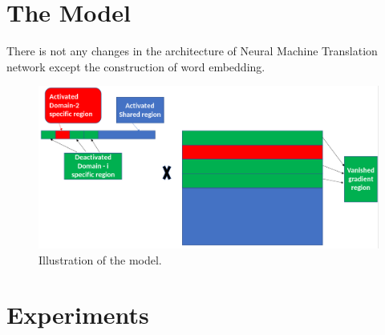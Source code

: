 \documentclass[11pt,a4paper]{article}
\begin{document}
\section{The Model}
There is not any changes in the architecture of Neural Machine Translation network except the construction of word embedding. 
\begin{figure}[h]
\center
    \includegraphics[width=0.8\linewidth]{Sparse1}
    \caption{Illustration of the model.} 
    \label{network}
\end{figure}
\section{Experiments}
\end{document}
